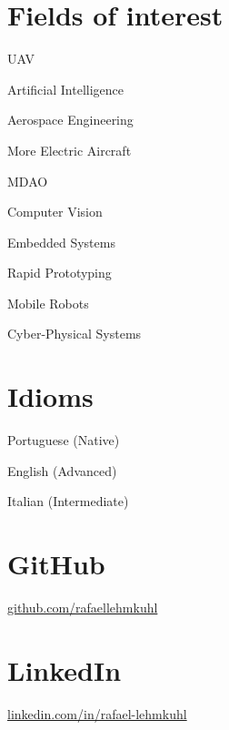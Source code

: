 \documentclass[A4]{deedy-resume} %
\begin{document}
\newpage %

\begin{minipage}[t]{0.32\textwidth} %
\section{Fields of interest}
\vspace{\topsep} %
\begin{tightitemize}
\item UAV
\item Artificial Intelligence
\item Aerospace Engineering
\item More Electric Aircraft
\item MDAO
\item Computer Vision
\item Embedded Systems
\item Rapid Prototyping
\item Mobile Robots
\item Cyber-Physical Systems
\end{tightitemize}

\vspace*{0.2cm}

\section{Idioms}
\vspace{\topsep} %
\begin{tightitemize}
\item Portuguese (Native)
\item English (Advanced)
\item Italian (Intermediate)
\end{tightitemize}

\vspace*{0.2cm}

\section{GitHub}
\href{https://github.com/rafaellehmkuhl}{github.com/rafaellehmkuhl}

\vspace*{0.2cm}

\section{LinkedIn}
\href{https://www.linkedin.com/in/rafael-lehmkuhl/}{linkedin.com/in/rafael-lehmkuhl}


\end{minipage} %
\end{document}
